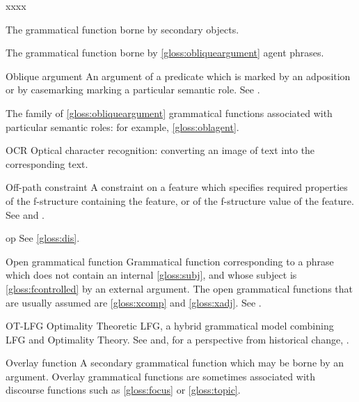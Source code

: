 \documentclass[output=paper,colorlinks,citecolor=brown]{langscibook}
\begin{document}
\begin{labeling}{xxxx}
\item[\OBJ2\namedlabel{gloss:obj2}{\OBJ2}] The grammatical function borne by secondary objects.

\item[\OBLROLE{agent}\namedlabel{gloss:oblagent}{\OBLROLE{agent}}] The grammatical function borne by \ref{gloss:obliqueargument} agent phrases.

\item[Oblique argument\namedlabel{gloss:obliqueargument}{oblique}] An argument of a predicate which is marked by an adposition or by casemarking marking a particular semantic role.  See \citetv[\ref{sect:gfs:obl}]{chapters/GFs}.

\item[\OBLTHETA\namedlabel{gloss:obltheta}{\OBLTHETA}\namedlabel{gloss:obliquetheta}{oblique}] The family of \ref{gloss:obliqueargument} grammatical functions associated with particular semantic roles: for example, \ref{gloss:oblagent}.

\item[OCR] Optical character recognition: converting an image of text into the corresponding text.

\item[Off-path constraint\namedlabel{gloss:OffPathConstraint}{off-path constraint}] A constraint on a feature which specifies required properties of the f-structure containing the feature, or of the f-structure value of the feature.  See \citetv[\ref{sect:constequ}]{chapters/CoreConcepts} and .

\item[op] See \ref{gloss:dis}.

\item[Open grammatical function\namedlabel{gloss:open}{open grammatical function}] Grammatical function corresponding to a phrase which does not contain an internal \ref{gloss:subj}, and whose subject is \ref{gloss:fcontrolled} by an external argument.  The open grammatical functions that are usually assumed are \ref{gloss:xcomp} and \ref{gloss:xadj}.  See .

\item[OT-LFG] Optimality Theoretic LFG, a hybrid grammatical model combining LFG and Optimality Theory. See  and, for a perspective from historical change, \citetv[\ref{sec:Historical:var}]{chapters/Historical}.

\item[Overlay function \namedlabel{gloss:overlay}{overlay function}\namedlabel{gloss:Overlay}{Overlay function}] A secondary grammatical function which may be borne by an argument.  Overlay grammatical functions are sometimes associated with discourse functions such as \ref{gloss:focus} or \ref{gloss:topic}.


\end{labeling}
\end{document}
